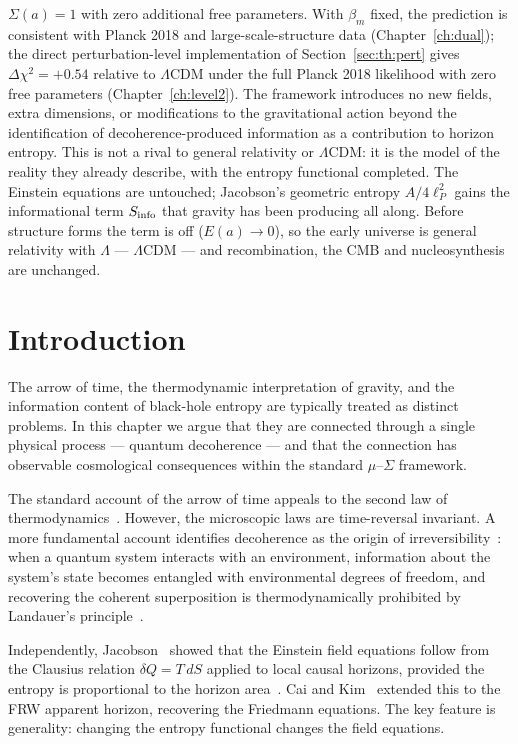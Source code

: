 $\Sigma(a)=1$ with zero additional free parameters. With $\beta_m$ fixed, the prediction is consistent with Planck 2018 and large-scale-structure data
(Chapter~\ref{ch:dual}); the direct perturbation-level implementation of Section~\ref{sec:th:pert} gives $\Delta\chi^2=+0.54$ relative to $\Lambda$CDM under the full
Planck 2018 likelihood with zero free parameters (Chapter~\ref{ch:level2}).
The framework introduces no new fields, extra dimensions, or modifications to the gravitational action beyond the identification of
decoherence-produced information as a contribution to horizon entropy. This is not a rival to general relativity or $\Lambda$CDM: it is the model of
the reality they already describe, with the entropy functional completed. The Einstein equations are untouched; Jacobson's geometric entropy
$A/4\ell_P^2$ gains the informational term $S_{\rm info}$ that gravity has been producing all along. Before structure forms the term is off
($E(a)\to0$), so the early universe is general relativity with $\Lambda$ --- $\Lambda$CDM --- and recombination, the CMB and nucleosynthesis are
unchanged.

\section{Introduction}\label{sec:th:intro}
The arrow of time, the thermodynamic interpretation of gravity, and the information content of black-hole entropy are typically treated as distinct
problems. In this chapter we argue that they are connected through a single physical process --- quantum decoherence --- and that the connection has
observable cosmological consequences within the standard $\mu$--$\Sigma$ framework.

The standard account of the arrow of time appeals to the second law of thermodynamics~\cite{Penrose1989}. However, the microscopic laws are
time-reversal invariant. A more fundamental account identifies decoherence as the origin of irreversibility~\cite{Zurek2003,Schlosshauer2007}: when a quantum system
interacts with an environment, information about the system's state becomes entangled with environmental degrees of freedom, and recovering the
coherent superposition is thermodynamically prohibited by Landauer's principle~\cite{Landauer1961}.

Independently, Jacobson~\cite{Jacobson1995} showed that the Einstein field equations follow from the Clausius relation $\delta Q=T\,dS$ applied to local causal
horizons, provided the entropy is proportional to the horizon area~\cite{Bekenstein1973,Hawking1975}. Cai and Kim~\cite{CaiKim2005} extended this to the FRW apparent horizon, recovering the
Friedmann equations. The key feature is generality: changing the entropy functional changes the field equations.

